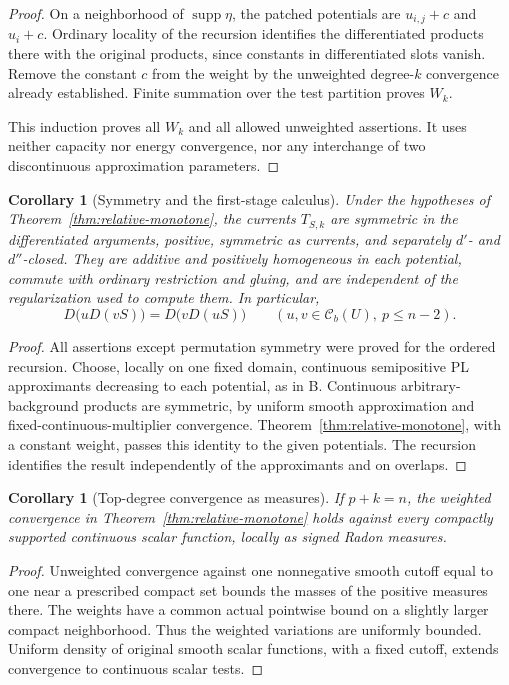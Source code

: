 \documentclass[11pt,a4paper]{article}
\numberwithin{equation}{section}
\newtheorem{corollary}[theorem]{Corollary}
\theoremstyle{definition}
\theoremstyle{remark}
\newcommand{\Cb}{\mathcal C_b}
\begin{document}
\begin{proof}
On a neighborhood of $\operatorname{supp}\eta$, the patched potentials
are $u_{i,j}+c$ and $u_i+c$. Ordinary locality of the recursion identifies
the differentiated products there with the original products, since
constants in differentiated slots vanish. Remove the constant $c$ from
the weight by the unweighted degree-$k$ convergence already established.
Finite summation over the test partition proves $W_k$.

This induction proves all $W_k$ and all allowed unweighted assertions.
It uses neither capacity nor energy convergence, nor any interchange
of two discontinuous approximation parameters.
\end{proof}

\begin{corollary}[Symmetry and the first-stage calculus]
\label{cor:full-calculus}
Under the hypotheses of Theorem~\ref{thm:relative-monotone}, the currents
$T_{S,k}$ are symmetric in the differentiated arguments,
positive, symmetric as currents, and separately $d'$- and $d''$-closed.
They are additive and positively homogeneous in each potential, commute
with ordinary restriction and gluing, and are independent of the
regularization used to compute them. In particular,
\[
 D\bigl(uD(vS)\bigr)=D\bigl(vD(uS)\bigr)
 \qquad(u,v\in\Cb(U),\ p\leq n-2).
\]
\end{corollary}

\begin{proof}
All assertions except permutation symmetry were proved for the ordered
recursion. Choose, locally on one fixed domain, continuous semipositive
PL approximants decreasing to each potential, as in \textup{B}.
Continuous arbitrary-background products are symmetric, by uniform
smooth approximation and fixed-continuous-multiplier convergence.
Theorem~\ref{thm:relative-monotone}, with a constant weight, passes this
identity to the given potentials. The recursion identifies the result
independently of the approximants and on overlaps.
\end{proof}

\begin{corollary}[Top-degree convergence as measures]
\label{cor:top-measures}
If $p+k=n$, the weighted convergence in
Theorem~\ref{thm:relative-monotone} holds against every compactly
supported continuous scalar function, locally as signed Radon measures.
\end{corollary}

\begin{proof}
Unweighted convergence against one nonnegative smooth cutoff equal to
one near a prescribed compact set bounds the masses of the positive
measures there. The weights have a common actual pointwise bound on a
slightly larger compact neighborhood. Thus the weighted variations are
uniformly bounded. Uniform density of original smooth scalar functions,
with a fixed cutoff, extends convergence to continuous scalar tests.
\end{proof}
\end{document}

